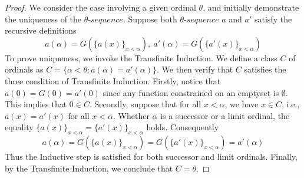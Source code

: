 \begin{proof}
  We consider the case involving a given ordinal $\theta$, and initially demonstrate the uniqueness of the $\theta \mbox{-}sequence$. Suppose both $\theta \mbox{-}sequence$ $a$ and $a'$ satisfy the recursive definitions
  \begin{equation*}
    a(\alpha) = G(\{ a(x) \}_{x < \alpha}), \ a'(\alpha) = G(\{ a'(x) \}_{x < \alpha})
  \end{equation*}
  To prove uniqueness, we invoke the Transfinite Induction. We define a class $C$ of ordinals as $C=\{ \alpha < \theta: a(\alpha) = a'(\alpha) \}$. We then verify that $C$ satisfies the three condition of Transfinite Induction.
  Firstly, notice that $a(0) = G(0) = a'(0)$ since any function constrained on an emptyset is $\emptyset$. This implies that $0 \in C$. 
  Secondly, suppose that for all $x < \alpha$, we have $x \in C$, i.e., $a(x) = a'(x)$ for all $x < \alpha$. Whether $\alpha$ is a successor or a limit ordinal, the equality $\{ a(x) \}_{x < \alpha} = \{ a'(x) \}_{x < \alpha}$ holds. Consequently
  \begin{equation*}
    a(\alpha) = G(\{ a(x) \}_{x < \alpha}) = G(\{ a'(x) \}_{x < \alpha}) = a'(\alpha)
  \end{equation*}
  Thus the Inductive step is satisfied for both successor and limit ordinals. Finally, by the Transfinite Induction, we conclude that $C = \theta$.


\end{proof}
